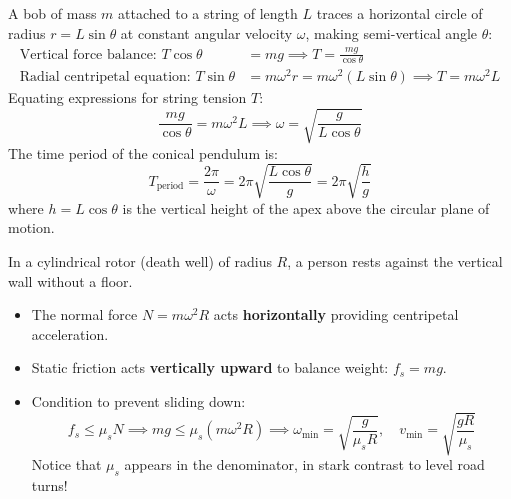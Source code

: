 \documentclass[10pt,twoside,openright]{book}
\begin{document}
\begin{usecasebox}
A bob of mass $m$ attached to a string of length $L$ traces a horizontal circle of radius $r = L\sin\theta$ at constant angular velocity $\omega$, making semi-vertical angle $\theta$:
\begin{align}
  \text{Vertical force balance: } T\cos\theta &= mg \implies T = \frac{mg}{\cos\theta} \\
  \text{Radial centripetal equation: } T\sin\theta &= m\omega^2 r = m\omega^2(L\sin\theta) \implies T = m\omega^2 L
\end{align}
Equating expressions for string tension $T$:
\begin{equation}
  \frac{mg}{\cos\theta} = m\omega^2 L \implies \omega = \sqrt{\frac{g}{L\cos\theta}}
\end{equation}
The time period of the conical pendulum is:
\begin{equation}
  T_{\text{period}} = \frac{2\pi}{\omega} = 2\pi\sqrt{\frac{L\cos\theta}{g}} = 2\pi\sqrt{\frac{h}{g}}
\end{equation}
where $h = L\cos\theta$ is the vertical height of the apex above the circular plane of motion.
\end{usecasebox}

\begin{trapbox}
In a cylindrical rotor (death well) of radius $R$, a person rests against the vertical wall without a floor.
\begin{itemize}
  \item The normal force $N = m\omega^2 R$ acts \textbf{horizontally} providing centripetal acceleration.
  \item Static friction acts \textbf{vertically upward} to balance weight: $f_s = mg$.
  \item Condition to prevent sliding down:
  \begin{equation}
    f_s \le \mu_s N \implies mg \le \mu_s(m\omega^2 R) \implies \omega_{\min} = \sqrt{\frac{g}{\mu_s R}}, \quad v_{\min} = \sqrt{\frac{gR}{\mu_s}}
  \end{equation}
  Notice that $\mu_s$ appears in the denominator, in stark contrast to level road turns!
\end{itemize}
\end{trapbox}

\end{document}

